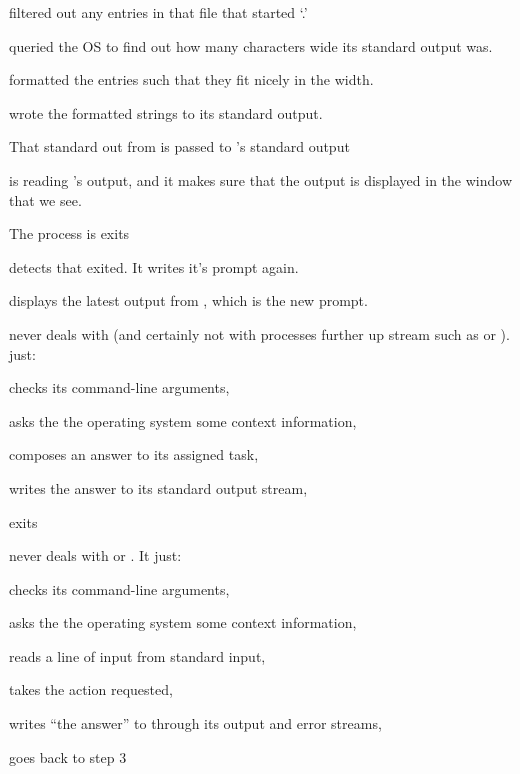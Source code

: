 \documentclass[landscape]{foils}
\begin{document}
\begin{compactitem}
	\item {} filtered out any entries in that file that started `.'
	\item {} queried the OS to find out how many characters wide its standard output was.
	\item {} formatted the entries such that they fit nicely in the width.
	\item {} wrote the formatted strings to its standard output.
	\item {\color{red}That standard out from  is passed to 's standard output}
	\item {\color{green} is reading 's output, and it makes sure that the output is displayed in the window that we see.}
	\item The  process is exits
	\item {\color{red} detects that  exited. It writes it's prompt again.}
	\item {\color{green} displays the latest output from , which is the new prompt.}	
		
\end{compactitem}


\myNewSlide
{} never deals with  (and certainly not with processes further up stream such as  or ).
 just:
\begin{compactitem}	
	\item checks its command-line arguments,
	\item asks the the operating system some context information,
	\item composes an answer to its assigned task,
	\item writes the answer to its standard output stream,
	\item exits
\end{compactitem}

\myNewSlide
{} never deals with  or .  It just:
\begin{compactenum}	
	\item checks its command-line arguments,
	\item asks the the operating system some context information,
	 \item reads a line of input from standard input,
	\item takes the action requested,
	\item writes ``the answer'' to through its output and error streams,
	\item goes back to step 3
\end{compactenum}
\end{document}
